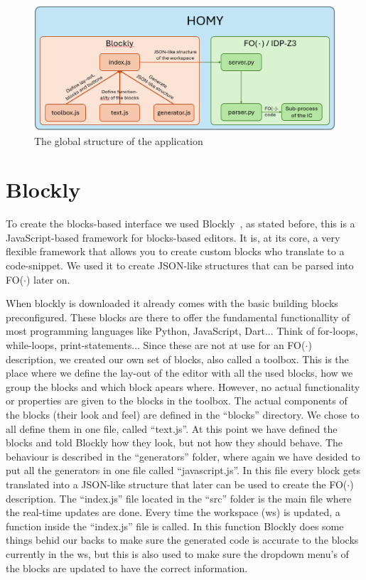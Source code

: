 \documentclass[11pt,a4paper]{report}
\newcommand{\fodot}{FO($\cdot$)\xspace}
\begin{document}
\begin{figure}
    \centering
    \includegraphics[width=1\linewidth]{images/global_structure.png}
    \caption{The global structure of the application}
    \label{fig:global_structure}
\end{figure}
\section{Blockly}
To create the blocks-based interface we used Blockly~\cite{Blockly}, as stated before, this is a JavaScript-based framework for blocks-based editors. It is, at its core, a very flexible framework that allows you to create custom blocks who translate to a code-snippet. We used it to create JSON-like structures that can be parsed into \fodot later on.

When blockly is downloaded it already comes with the basic building blocks preconfigured. These blocks are there to offer the fundamental functionallity of most programming languages like Python, JavaScript, Dart... Think of for-loops, while-loops, print-statements... Since these are not at use for an \fodot description, we created our own set of blocks, also called a toolbox. This is the place where we define the lay-out of the editor with all the used blocks, how we group the blocks and which block apears where. However, no actual functionality or properties are given to the blocks in the toolbox. The actual components of the blocks (their look and feel) are defined in the ``blocks'' directory. We chose to all define them in one file, called ``text.js''. At this point we have defined the blocks and told Blockly how they look, but not how they should behave. The behaviour is described in the ``generators'' folder, where again we have desided to put all the generators in one file called ``javascript.js''. In this file every block gets translated into a JSON-like structure that later can be used to create the \fodot description. The ``index.js'' file located in the ``src'' folder is the main file where the real-time updates are done. Every time the workspace (ws) is updated, a function inside the ``index.js'' file is called. In this function Blockly does some things behid our backs to make sure the generated code is accurate to the blocks currently in the ws, but this is also used to make sure the dropdown menu's of the blocks are updated to have the correct information.
\end{document}

